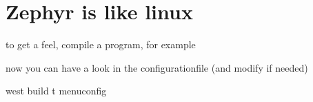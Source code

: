 \documentclass[letterpaper,10pt,english]{sphinxmanual}
\begin{document}
\section{Zephyr is like linux}
\label{\detokenize{menuconfig:zephyr-is-like-linux}}
  to get a feel, compile a program, for example

\begin{sphinxVerbatim}[commandchars=\\\{\}]
\end{sphinxVerbatim}

now you can have a look in the configurationfile (and modify if needed)

\begin{sphinxVerbatim}[commandchars=\\\{\}]
 west build \PYGZhy{}t menuconfig
\end{sphinxVerbatim}
\end{document}
